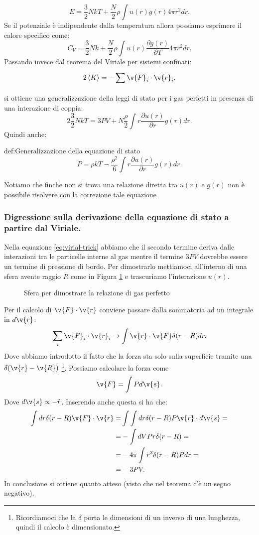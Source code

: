 \[
	E = \frac{3}{2}NkT 
	+
	\frac{N}{2}\rho \int u(r)g(r)4\pi r^2 dr
.\] 
Se il potenziale è indipendente dalla temperatura allora possiamo esprimere il calore specifico come:
\[
	C_V =
	\frac{3}{2}Nk 
	+
	\frac{N}{2}\rho \int u(r)\frac{\partial g(r)}{\partial T} 4\pi r^2 dr
.\] 
Passando invece dal teorema del Viriale per sistemi confinati:
\[
	2\left<K \right> = - \sum_{}^{} \v{F}_i\cdot\v{r}_i
.\] 
si ottiene una generalizzazione della leggi di stato per i gas perfetti in presenza di una interazione di coppia:
\[
	2 \frac{3}{2}NkT 
	=
	3PV
	+
	N \frac{\rho }{2}\int r \frac{\partial u(r)}{\partial r} g(r) dr
	\label{eq:virial-trick}
.\] 
Quindi anche:
\begin{defn}{def:Generalizzazione della equazione di stato}
	\[
	P 
	=
	\rho kT - \frac{\rho ^2}{6}\int r \frac{\partial u(r)}{\partial r} g(r) dr
	.\]
\end{defn}
Notiamo che finche non si trova una relazione diretta tra $u(r)$ e $g(r)$ non è possibile risolvere con la correzione tale equazione.
\subsubsection{Digressione sulla derivazione della equazione di stato a partire dal Viriale.}
\label{subsubsec:Digressione sulla derivazione della equazione di stato a partire dal Viriale.}
Nella equazione \ref{eq:virial-trick} abbiamo che il secondo termine deriva dalle interazioni tra le particelle interne al gas mentre il termine $3PV$ dovrebbe essere un termine di pressione di bordo. Per dimostrarlo mettiamoci all'interno di una sfera avente raggio $R$ come in Figura \ref{fig:sfera-per-dimostrare-la-relazione-di-gas-perfetto} e trascuriamo l'interazione $u(r)$.
\begin{figure}[ht]
    \centering
    \caption{Sfera per dimostrare la relazione di gas perfetto}
    \label{fig:sfera-per-dimostrare-la-relazione-di-gas-perfetto}
\end{figure}
Per il calcolo di $\v{F}\cdot\v{r}$ conviene passare dalla sommatoria ad un integrale in $d \v{r}$:
\[
	\sum_{i}^{} \v{F}_i\cdot\v{r}_{i} \to 
	\int\v{r}\cdot\v{F} \delta(r-R)dr
.\] 
Dove abbiamo introdotto il fatto che la forza sta solo sulla superficie tramite una $\delta(\v{r}-\v{R})$ \footnote{Ricordiamoci che la $\delta$ porta le dimensioni di un inverso di una lunghezza, quindi il calcolo è dimensionato.}.
Possiamo calcolare la forza come 
\[
	\v{F} = \int P d \v{s}
.\] 
Dove $d \v{s} \propto - \hat{r}$.
Inserendo anche questa si ha che:
\[\begin{aligned}
	\int dr\delta(r-R)  \v{F}\cdot\v{r}
	=&
	\int\int dr\delta(r-R)P \v{r}\cdot  d \v{s} =\\
	=&
	-\int d V Pr \delta(r-R) =\\
	=&
	-4\pi\int r^3 \delta(r-R)P dr =\\
	=&
	-3PV
.\end{aligned}\]
In conclusione si ottiene quanto atteso (visto che nel teorema c'è un segno negativo).
